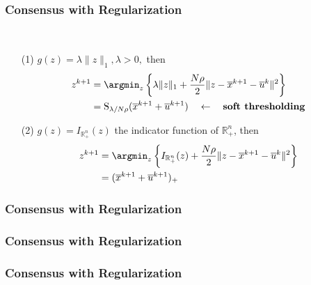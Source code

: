 
\begin{frame}
\frametitle{Consensus with Regularization}

\begin{eg}\ 
\begin{itemize}
\item[(1)] $g(z) = \lambda \lVert z \rVert_1, \lambda > 0,$ then
\begin{align*}
    z^{k+1} & = \argmin_z \left\{ \lambda \lVert z \rVert_1 + \dfrac{N\rho}{2} \lVert z - \overline{x}^{k+1} - \overline{u}^k \rVert^2 \right\} \\
    & = \operatorname{S}_{\lambda/N\rho} (\overline{x}^{k+1} + \overline{u}^{k+1}) \quad \leftarrow \quad \textbf{soft thresholding}
\end{align*}
\item[(2)] $g(z) = I_{\mathbb{R}^n_+}(z)$ the indicator function of $\mathbb{R}^n_+$, then
\begin{align*}
    z^{k+1} & = \argmin_z \left\{ I_{\mathbb{R}^n_+}(z) + \dfrac{N\rho}{2} \lVert z - \overline{x}^{k+1} - \overline{u}^k \rVert^2 \right\} \\
    & = (\overline{x}^{k+1} + \overline{u}^{k+1})_+
\end{align*}
\end{itemize}
\end{eg}
    
\end{frame}


\begin{frame}
\frametitle{Consensus with Regularization}
    
\end{frame}


\begin{frame}
\frametitle{Consensus with Regularization}
    
\end{frame}


\begin{frame}
\frametitle{Consensus with Regularization}
    
\end{frame}


